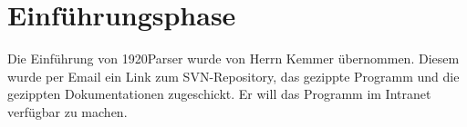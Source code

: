 \section{Einführungsphase}
\label{sec:Einfuehrungsphase}
Die Einführung von 1920Parser wurde von Herrn Kemmer übernommen. Diesem wurde per Email ein Link zum \ac{SVN}-Repository, das gezippte Programm und die gezippten Dokumentationen zugeschickt. Er will das Programm im Intranet verfügbar zu machen.

